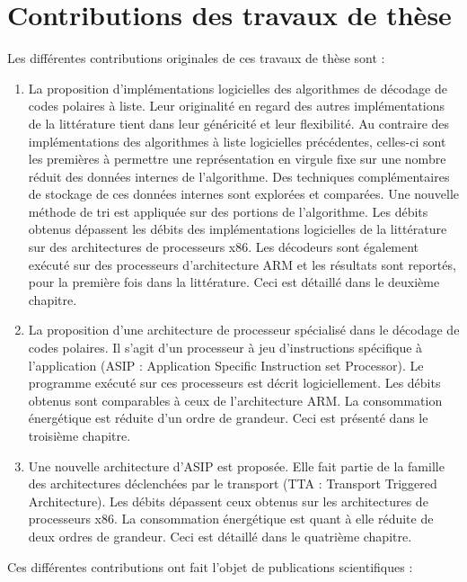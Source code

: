 \section*{Contributions des travaux de thèse}
Les différentes contributions originales de ces travaux de thèse sont : 
\begin{enumerate}
	\item La proposition d'implémentations logicielles des algorithmes de décodage de codes polaires à liste. Leur originalité en regard des autres implémentations de la littérature tient dans leur généricité et leur flexibilité. Au contraire des implémentations des algorithmes à liste logicielles précédentes, celles-ci sont les premières à permettre une représentation en virgule fixe sur une nombre réduit des données internes de l'algorithme. Des techniques complémentaires de stockage de ces données internes sont explorées et comparées. Une nouvelle méthode de tri est appliquée sur des portions de l'algorithme. Les débits obtenus dépassent les débits des implémentations logicielles de la littérature sur des architectures de processeurs x86. Les décodeurs sont également exécuté sur des processeurs d’architecture ARM et les résultats sont reportés, pour la première fois dans la littérature. Ceci est détaillé dans le deuxième chapitre.
  	\item La proposition d'une architecture de processeur spécialisé dans le décodage de codes polaires. Il s'agit d'un processeur à jeu d'instructions spécifique à l'application (ASIP : Application Specific Instruction set Processor). Le programme exécuté sur ces processeurs est décrit logiciellement. Les débits obtenus sont comparables à ceux de l'architecture ARM. La consommation énergétique est réduite d'un ordre de grandeur. Ceci est présenté dans le troisième chapitre.
  	\item Une nouvelle architecture d'ASIP est proposée. Elle fait partie de la famille des architectures déclenchées par le transport (TTA : Transport Triggered Architecture). Les débits  dépassent ceux obtenus sur les architectures de processeurs x86. La consommation énergétique est quant à elle réduite de deux ordres de grandeur. Ceci est détaillé dans le quatrième chapitre.

\end{enumerate}


Ces différentes contributions ont fait l'objet de publications scientifiques : \\

